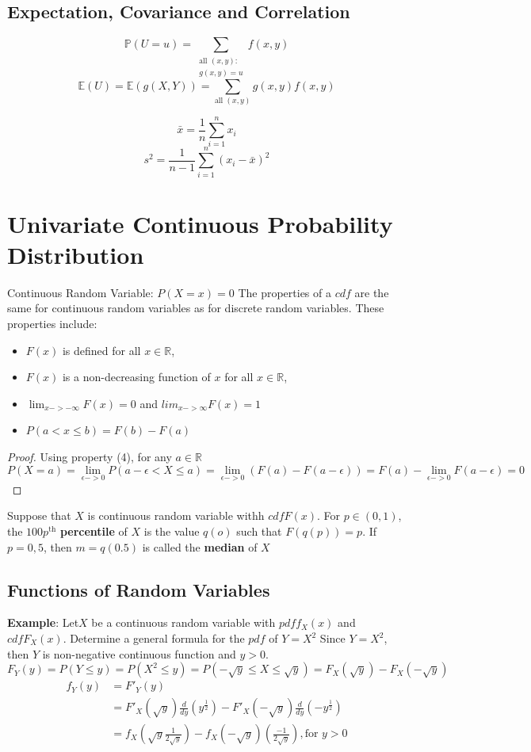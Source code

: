 \documentclass{article}
\newcommand{\R}{\mathbb{R}}
\newcommand{\E}{\mathbb{E}}
\renewcommand{\P}{\mathbb{P}}
\begin{document}
\subsection{Expectation, Covariance and Correlation}

$$ \P(U = u) = \sum_{\substack{\text{all }(x, y): \\ g(x, y) = u}} f(x, y) $$
$$ \E(U) = \E(g(X, Y)) = \sum_{\text{all }(x,y)} g(x,y) f(x,y) $$

$$ \bar{x} = \frac{1}{n} \sum_{i=1}^{n} x_i $$
$$ s^2 = \frac{1}{n - 1} \sum_{i=1}^{n} (x_i - \bar{x}) ^ 2$$





\newpage
\section{Univariate Continuous Probability Distribution}
Continuous Random Variable: $P(X=x) = 0$
The properties of a $cdf$ are the same for continuous random variables as for discrete random variables. These properties include:
\begin{itemize}
    \item $F(x)$ is defined for all $x \in \R$,
    \item $F(x)$ is a non-decreasing function of $x$ for all $x\in \R$,
    \item $\lim_{x -> -\infty} F(x) = 0$ and $lim_{x -> \infty} F(x) = 1$
    \item $P(a < x \le b) = F(b) - F(a)$
\end{itemize}

\begin{proof}
    Using property (4), for any $a \in \R$
    $$P(X = a) = \lim_{\epsilon -> 0}P(a-\epsilon < X \le a) = \lim_{\epsilon -> 0}(F(a) - F(a - \epsilon)) = F(a) - \lim_{\epsilon -> 0}F(a - \epsilon) = 0$$
\end{proof}
\noindent Suppose that $X$ is continuous random variable withh $cdfF(x)$. For $p \in (0, 1)$, the $100p^\text{th}$ \textbf{percentile} of $X$ is the value $q(o)$ such that $F(q(p)) = p$. If $p = 0,5$, then $m = q(0.5)$ is called the \textbf{median} of $X$

\subsection{Functions of Random Variables}
\textbf{Example}: Let$X$ be a continuous random variable with $pdf f_{X}(x)$ and $cdf F_{X}(x)$. Determine a general formula for the $pdf$ of $Y=X^2$
Since $Y = X^2$, then $Y$ is non-negative continuous function and $y > 0$.
$$F_{Y}(y) = P(Y \le y) = P(X^2 \le y) = P(- \sqrt{y} \le X \le \sqrt{y}) = F_X(\sqrt{y}) - F_X(- \sqrt{y})$$
\begin{align*}
    f_Y(y) &= F'_Y(y)\\
        &= F'_X(\sqrt{y})\frac{d}{dy}(y^{\frac{1}{2}}) - F'_X(- \sqrt{y})\frac{d}{dy}(-y^{\frac{1}{2}})\\
        &= f_X(\sqrt{y} \frac{1}{2\sqrt{y}}) - f_X(-\sqrt{y})(\frac{-1}{2\sqrt{y}}), \text{for } y > 0\\
\end{align*}
\end{document}
